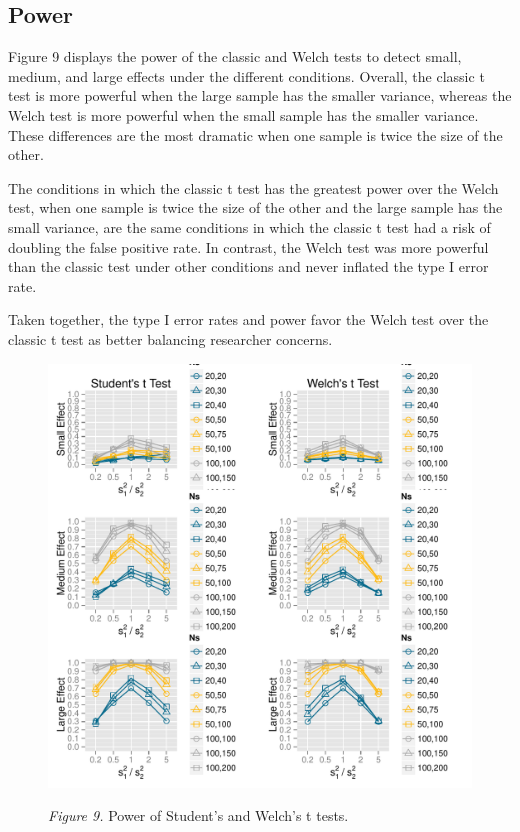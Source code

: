 \documentclass[man,a4paper,noextraspace,apacite]{apa6}\usepackage[]{graphicx}\usepackage[]{color}
\makeatletter
\def\maxwidth{ %
  \ifdim\Gin@nat@width>\linewidth
    \linewidth
  \else
    \Gin@nat@width
  \fi
}
\newenvironment{knitrout}{}{} %
\makeatother
\begin{document}
\subsection{Power}




    Figure 9 displays the power of the classic and Welch tests to detect small, medium, and large effects under the different conditions. Overall, the classic t test is more powerful when the large sample has the smaller variance, whereas the Welch test is more powerful when the small sample has the smaller variance. These differences are the most dramatic when one sample is twice the size of the other. 
    
    The conditions in which the classic t test has the greatest power over the Welch test, when one sample is twice the size of the other and the large sample has the small variance, are the same conditions in which the classic t test had a risk of doubling the false positive rate. In contrast, the Welch test was more powerful than the classic test under other conditions and never inflated the type I error rate.

    Taken together, the type I error rates and power favor the Welch test over the classic t test as better balancing researcher concerns.
\begin{figure}
\begin{knitrout}
\color{fgcolor}
\includegraphics[width=\maxwidth]{figure/plotPower} 

\end{knitrout}
\textit{Figure 9.} Power of Student's and Welch's t tests.
\end{figure}
\end{document}

